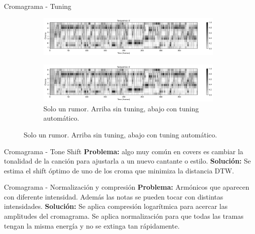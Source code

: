 \documentclass{beamer}
\begin{document}
\begin{frame}{Cromagrama - Tuning}
    \begin{figure}
        \begin{subfigure}{\textwidth}
        \centering
        \includegraphics[width=\textwidth]{chromas/solo_un_rumor_sin.png}
        \label{fig:my_label}
        \end{subfigure}
        \vfill
        \begin{subfigure}{\textwidth}
        \centering
        \includegraphics[width=\textwidth]{chromas/solo_un_rumor_tuning.png}
        \caption{Solo un rumor. Arriba sin tuning, abajo con tuning automático.}
        \label{fig:my_label}
        \end{subfigure}
    \end{figure}
\end{frame}

\begin{frame}{Cromagrama - Tone Shift}
    \textbf{Problema:} algo muy común en covers es cambiar la tonalidad de la canción para ajustarla a un nuevo cantante o estilo.
    \vfill
    \textbf{Solución:} Se estima el shift óptimo de uno de los croma que minimiza la distancia DTW. 
\end{frame}

\begin{frame}{Cromagrama - Normalización y compresión}
    \textbf{Problema:} Armónicos que aparecen con diferente intensidad. Además las notas se pueden tocar con distintas intensidades.
    \vfill
    \textbf{Solución:} Se aplica compresión logarítmica para acercar las amplitudes del cromagrama. Se aplica normalización para que todas las tramas tengan la misma energía y no se extinga tan rápidamente. 
\end{frame}
\end{document}
